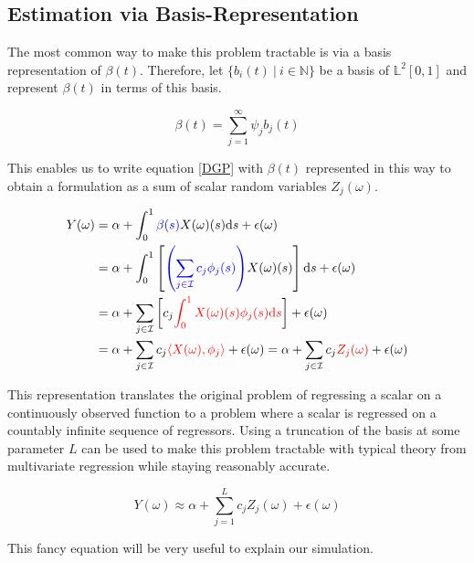 \documentclass[11pt,twoside,a4paper]{article}
\begin{document}
	\subsection{Estimation via Basis-Representation}
	The most common way to make this problem tractable is via a basis representation of $\beta(t)$. Therefore, let $\{b_i(t) \: \vert \: i \in \mathbb{N}\}$ be a basis of $\mathbb{L}^2[0,1]$ and represent $\beta(t)$ in terms of this basis.
	
	\begin{equation}
		\beta(t) = \sum_{j = 1}^{\infty} \psi_j b_j(t)
	\end{equation}
	
	This enables us to write equation \ref{DGP} with $\beta(t)$ represented in this way to obtain a formulation as a sum of scalar random variables $Z_j(\omega)$.
	
	\begin{equation}
		\begin{split}
			Y(\omega) & = \alpha + \int_{0}^{1} {\color{blue}\beta(s)} X(\omega)(s)\mathrm{d}s + \epsilon(\omega) \\
			& = \alpha + \int_{0}^{1}\left[{\color{blue}\left(\sum_{j \in \mathcal{I}} c_j \phi_j(s)\right)} X(\omega)(s) \right]\mathrm{d}s + \epsilon(\omega) \\
			& = \alpha + \sum_{j \in \mathcal{I}} \left[c_j \textcolor{red}{\int_{0}^{1} X(\omega)(s) \phi_j(s)\mathrm{d}s}\right] + \epsilon(\omega) \\
			& = \alpha + \sum_{j \in \mathcal{I}} c_j \textcolor{red}{\langle X(\omega), \phi_j \rangle} + \epsilon(\omega) 
		      = \alpha + \sum_{j \in \mathcal{I}} c_j \textcolor{red}{Z_j(\omega)} + \epsilon(\omega)
		\end{split}
	\end{equation}
	
	This representation translates the original problem of regressing a scalar on a continuously observed function to a problem where a scalar is regressed on a countably infinite sequence of regressors. Using a truncation of the basis at some parameter $L$ can be used to make this problem tractable with typical theory from multivariate regression while staying reasonably accurate.
	
	\begin{equation}
			Y(\omega) \approx \alpha + \sum_{j = 1}^{L} c_j Z_j(\omega) + \epsilon(\omega)
	\end{equation}

	{\color{red} This fancy equation will be very useful to explain our simulation.}
	
\end{document}
